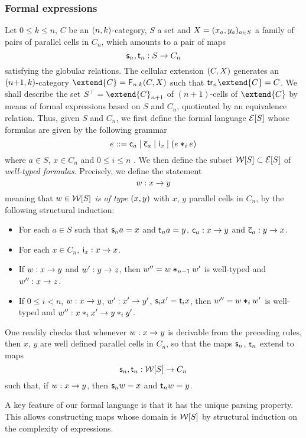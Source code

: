 \subsubsection{Formal expressions}\label{ssubsec:formex}
Let $0\leq k\leq n$, $C$ be an $(n,k)$-category, $S$ a set and $X=(x_a,y_a)_{a\in S}$
a family of pairs of parallel cells in $C_n$, which amounts to a pair
of maps
\[\mathsf{s}_{n},\mathsf{t}_{n}:S\to C_n\]
satisfying the globular relations. The cellular extension
$(C,X)$ generates an $(n{+}1,k)$-category $\extend{C}=\frf{n,k}\pair
CX$ such that $\trk n \extend{C}=C$. We shall describe the set $\frgp S=\extend{C}_{n+1}$ of
$(n{+}1)$-cells of $\extend{C}$ by means of formal expressions
based on $S$ and $C_n$, quotiented by an equivalence relation. Thus,
given $S$ and $C_n$, we first define the formal language $\mathcal{E}[S]$
whose formulas are given by the following grammar
\[
  e ::= \mathsf{c}_{a} \mid \overline{\mathsf{c}}_{a} \mid \mathsf{i}_{x} \mid (e\bm{\ast}_{i} e)
\]
where $a\in S$, $x\in C_n$ and $0\leq i\leq n$ . We then define the
subset  $\mathcal{W}[S]\subset\mathcal{E}[S]$ of {\em well-typed formulas}.
Precisely, we define the statement
\[w:x\to y\]
meaning that {\em $w\in\mathcal{W}[S]$ is of type $(x,y)$} with $x$, $y$ parallel
cells in $C_n$, by the following structural induction:
\begin{itemize}
\item For each $a\in S$ such that $\mathsf{s}_{n} a=x$ and $\mathsf{t}_{n} a=y$,
  $\mathsf{c}_{a}:x\to y$
  and $\overline{\mathsf{c}}_{a}:y\to x$.
\item For  each $x\in C_n$, $\mathsf{i}_{x}:x\to x$.
 \item If $w:x\to y$ and $w':y\to z$, then $w''=w\bm{\ast}_{n-1}w'$ is
   well-typed and $w'':x\to z$.
 \item If $0\leq i<n$, $w:x\to y$, $w':x'\to y'$, $\mathsf{s}_{i}{x'}=\mathsf{t}_{i}{x}$, then $w''=w\bm{\ast}_{i} w'$ is well-typed and
   $w'':x\ast_{i} x'\to y\ast_{i} y'$. 
 \end{itemize}
 One readily checks that whenever $w:x\to y$ is derivable from the
 preceding rules, then $x$, $y$ are well defined parallel cells in
 $C_n$, so that the maps $\mathsf{s}_{n}$, $\mathsf{t}_{n}$ extend to maps
 \[\mathsf{s}_{n}, \mathsf{t}_{n} :\mathcal{W}[S]\to C_n\]
 such that, if $w:x\to y$,  then $\mathsf{s}_{n} w=x$ and $\mathsf{t}_{n} w=y$.
 \begin{remark}
   A key feature of our formal language is that it has the unique
   parsing property. This allows constructing maps whose domain is $\mathcal{W}[S]$
   by structural induction on the complexity of expressions.
 \end{remark}

